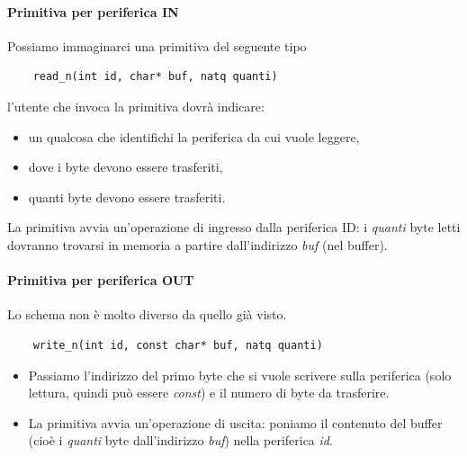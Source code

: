 \paragraph{Primitiva per periferica IN} Possiamo immaginarci una primitiva del seguente tipo
\begin{verbatim}
	read_n(int id, char* buf, natq quanti)
\end{verbatim}
l'utente che invoca la primitiva dovrà indicare: 
\begin{itemize}
	\item un qualcosa che identifichi la periferica da cui vuole leggere,
	\item dove i byte devono essere trasferiti,
	\item quanti byte devono essere trasferiti.
\end{itemize}  
La primitiva avvia un'operazione di ingresso dalla periferica ID: i \emph{quanti} byte letti dovranno trovarsi in memoria a partire dall'indirizzo \emph{buf} (nel buffer).

\paragraph{Primitiva per periferica OUT}
Lo schema non è molto diverso da quello già visto.
\begin{verbatim}
	write_n(int id, const char* buf, natq quanti)
\end{verbatim} 
\begin{itemize}
	\item Passiamo l'indirizzo del primo byte che si vuole scrivere sulla periferica (solo lettura, quindi può essere \emph{const}) e il numero di byte da  trasferire.
	\item La primitiva avvia un'operazione di uscita: poniamo il contenuto del buffer (cioè i \emph{quanti} byte dall'indirizzo \emph{buf}) nella periferica \emph{id}. 
\end{itemize}





